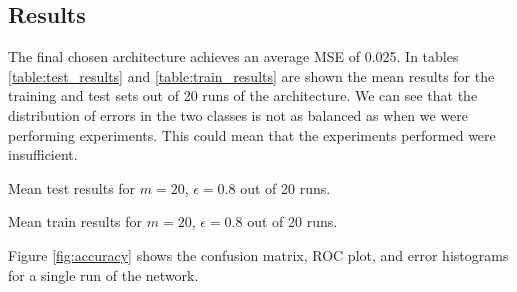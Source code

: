 \documentclass[a4paper, 11pt]{article}
\begin{document}
\subsection{Results}
The final chosen architecture achieves an average MSE of 0.025. In tables \ref{table:test_results} and \ref{table:train_results} are shown the mean results for the training and test sets out of 20 runs of the architecture. We can see that the distribution of errors in the two classes is not as balanced as when we were performing experiments. This could mean that the experiments performed were insufficient. 
\begin{table}[h!]
\caption{Mean test results for $m=20$, $\epsilon=0.8$ out of 20 runs.}
\label{table:test_results}
\end{table}

\begin{table}[h!]
\caption{Mean train results for $m=20$, $\epsilon=0.8$ out of 20 runs.}
\label{table:train_results}
\end{table}


Figure \ref{fig:accuracy} shows the confusion matrix, ROC plot, and error histograms for a single run of the network.
\end{document}
